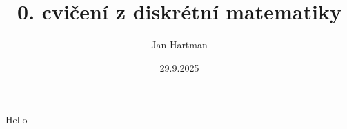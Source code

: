 \documentclass[11pt]{report}
\title{0. cvičení z diskrétní matematiky}
\author{Jan Hartman}
\date{29.9.2025}
\begin{document}
\noindent
Hello
\end{document}
